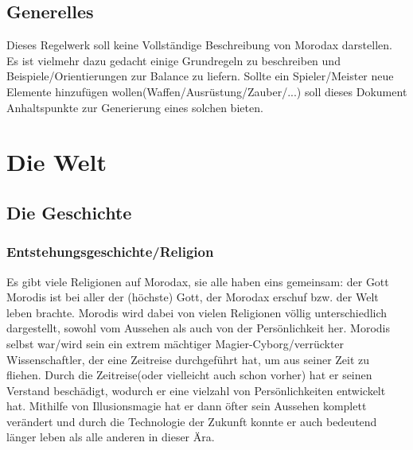 \raggedright
\chapter{Generelles}
Dieses Regelwerk soll keine Vollständige Beschreibung von Morodax darstellen. Es ist vielmehr dazu gedacht einige Grundregeln zu beschreiben und Beispiele/Orientierungen zur Balance zu liefern. Sollte ein Spieler/Meister neue Elemente hinzufügen wollen(Waffen/Ausrüstung/Zauber/...) soll dieses Dokument Anhaltspunkte zur Generierung eines solchen bieten.

\part{Die Welt}
\chapter{Die Geschichte}
\section{Entstehungsgeschichte/Religion}
Es gibt viele Religionen auf Morodax, sie alle haben eins gemeinsam: der Gott Morodis ist bei aller der (höchste) Gott, der Morodax erschuf bzw. der Welt leben brachte. Morodis wird dabei von vielen Religionen völlig unterschiedlich dargestellt, sowohl vom Aussehen als auch  von der Persönlichkeit her. Morodis selbst war/wird sein ein extrem mächtiger Magier-Cyborg/verrückter Wissenschaftler, der eine Zeitreise durchgeführt hat, um aus seiner Zeit zu fliehen. Durch die Zeitreise(oder vielleicht auch schon vorher) hat er seinen Verstand beschädigt, wodurch er eine vielzahl von Persönlichkeiten entwickelt hat. Mithilfe von Illusionsmagie hat er dann öfter sein Aussehen komplett verändert und durch die Technologie der Zukunft konnte er auch bedeutend länger leben als alle anderen in dieser Ära.

